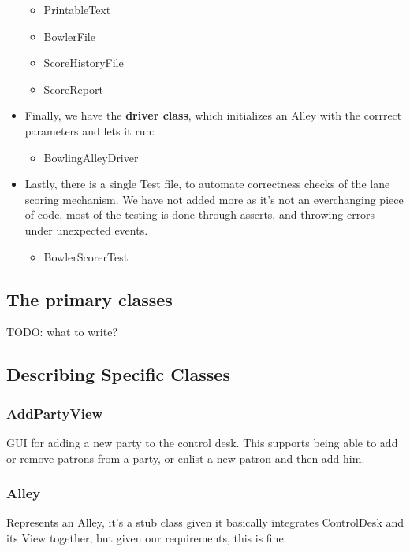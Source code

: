 \begin{itemize}
\begin{itemize}
              \item PrintableText
              \item BowlerFile
              \item ScoreHistoryFile
              \item ScoreReport
          \end{itemize}
    \item Finally, we have the \textbf{driver class}, which initializes an Alley with the corrrect parameters and lets it run:
          \begin{itemize}
              \item BowlingAlleyDriver
          \end{itemize}
    \item Lastly, there is a single Test file, to automate correctness checks of the lane scoring mechanism. We have not added more as it's not an everchanging piece of code, most of the testing is done through asserts, and throwing errors under unexpected events.
          \begin{itemize}
              \item BowlerScorerTest
          \end{itemize}
\end{itemize}

\subsection{The primary classes}

TODO: what to write?

\subsection{Describing Specific Classes}

\subsubsection{AddPartyView}
GUI for adding a new party to the control desk. This supports being able to add or remove patrons from a party, or enlist a new patron and then add him.

\subsubsection{Alley}
Represents an Alley, it's a stub class given it basically integrates ControlDesk and its View together, but given our requirements, this is fine.

